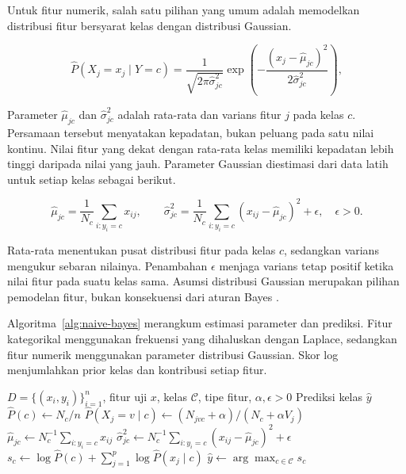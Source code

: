 Untuk fitur numerik, salah satu pilihan yang umum adalah memodelkan distribusi fitur bersyarat kelas dengan distribusi Gaussian.

\begin{equation}
    \widehat{P}(X_j=x_j\mid Y=c)=\frac{1}{\sqrt{2\pi\hat{\sigma}_{jc}^{2}}}\exp\left(-\frac{(x_j-\hat{\mu}_{jc})^2}{2\hat{\sigma}_{jc}^{2}}\right),
    \label{eq:nb-gaussian}
\end{equation}

Parameter $\hat{\mu}_{jc}$ dan $\hat{\sigma}_{jc}^{2}$ adalah rata-rata dan varians fitur $j$ pada kelas $c$. Persamaan tersebut menyatakan kepadatan, bukan peluang pada satu nilai kontinu. Nilai fitur yang dekat dengan rata-rata kelas memiliki kepadatan lebih tinggi daripada nilai yang jauh. Parameter Gaussian diestimasi dari data latih untuk setiap kelas sebagai berikut.

\begin{equation}
    \hat{\mu}_{jc}=\frac{1}{N_c}\sum_{i:y_i=c}x_{ij},
    \qquad
    \hat{\sigma}_{jc}^{2}=\frac{1}{N_c}\sum_{i:y_i=c}(x_{ij}-\hat{\mu}_{jc})^2+\epsilon,
    \quad\epsilon>0.
    \label{eq:nb-gaussian-parameters}
\end{equation}

Rata-rata menentukan pusat distribusi fitur pada kelas $c$, sedangkan varians mengukur sebaran nilainya. Penambahan $\epsilon$ menjaga varians tetap positif ketika nilai fitur pada suatu kelas sama. Asumsi distribusi Gaussian merupakan pilihan pemodelan fitur, bukan konsekuensi dari aturan Bayes \cite{scikitlearn_naive_bayes}.

Algoritma~\ref{alg:naive-bayes} merangkum estimasi parameter dan prediksi. Fitur kategorikal menggunakan frekuensi yang dihaluskan dengan Laplace, sedangkan fitur numerik menggunakan parameter distribusi Gaussian. Skor log menjumlahkan prior kelas dan kontribusi setiap fitur.

\begin{algorithm}[H]
    \caption{Pelatihan dan prediksi menggunakan Naive Bayes}
    \label{alg:naive-bayes}
    \begin{algorithmic}[1]
        \REQUIRE $D=\{(x_i,y_i)\}_{i=1}^{n}$, fitur uji $x$, kelas $\mathcal{C}$, tipe fitur, $\alpha,\epsilon>0$
        \ENSURE Prediksi kelas $\hat{y}$
        \STATE $\hat{P}(c)\leftarrow N_c/n$
        \STATE $\hat{P}(X_j=v\mid c)\leftarrow(N_{jvc}+\alpha)/(N_c+\alpha V_j)$
        \ENDFOR
        \ELSE
        \STATE $\hat{\mu}_{jc}\leftarrow N_c^{-1}\sum_{i:y_i=c}x_{ij}$
        \STATE $\hat{\sigma}_{jc}^{2}\leftarrow N_c^{-1}\sum_{i:y_i=c}(x_{ij}-\hat{\mu}_{jc})^2+\epsilon$
        \ENDIF
        \ENDFOR
        \ENDFOR
        \STATE $s_c\leftarrow\log\hat{P}(c)+\sum_{j=1}^{p}\log\hat{P}(x_j\mid c)$
        \ENDFOR
        \RETURN $\hat{y}\leftarrow\arg\max_{c\in\mathcal{C}}s_c$
    \end{algorithmic}
\end{algorithm}

